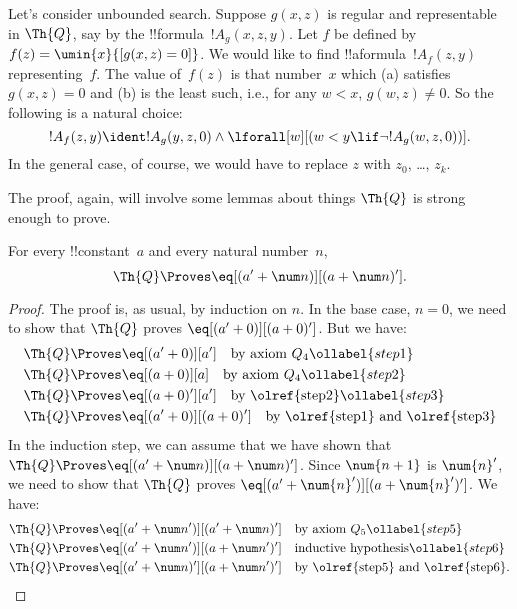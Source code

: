 \documentclass[../../../include/open-logic-section]{subfiles}
\begin{document}

Let's consider unbounded search. Suppose $g(x, z)$ is regular and
representable in $\Th{Q}$, say by the !!{formula}~$!A_g(x, z, y)$. Let
$f$ be defined by $f(z) = \umin{x}{[g(x, z) = 0]}$. We would like to find
!!a{formula}~$!A_f(z, y)$ representing~$f$.  The value of~$f(z)$ is
that number~$x$ which (a) satisfies $g(x, z) = 0$ and (b) is the least
such, i.e., for any $w < x$, $g(w, z) \neq 0$.  So the following is a
natural choice:
\[
!A_f(z,y) \ident !A_g(y, z, 0) \land \lforall[w][(w < y \lif \lnot
  !A_g(w, z, 0))].
\]
In the general case, of course, we would have to replace $z$ with
$z_0$, \dots, $z_k$.

The proof, again, will involve some lemmas about things $\Th{Q}$ is
strong enough to prove.

\begin{lem}
 For every !!{constant}~$a$ and every natural
number~$n$,
\[
\Th{Q} \Proves \eq[(a' + \num n)][(a + \num n)'].
\]
\end{lem}

\begin{proof}
The proof is, as usual, by induction on $n$. In the base case, $n =
0$, we need to show that $\Th{Q}$ proves $\eq[(a'+0)][(a+0)']$. But we have:
\begin{align}
  \Th{Q} & \Proves \eq[(a' + 0)][a'] \quad \text{by axiom $Q_4$}
  \ollabel{step1}\\
  \Th{Q} & \Proves  \eq[(a + 0)][a] \quad \text{by axiom $Q_4$}
  \ollabel{step2} \\
  \Th{Q} & \Proves \eq[(a + 0)'][a'] \quad \text{by \olref{step2}}
  \ollabel{step3} \\
  \Th{Q} & \Proves \eq[(a' + 0)][(a + 0)'] \quad
  \text{by \olref{step1} and \olref{step3}}\notag
\end{align}
In the induction step, we can assume that we have shown that $\Th{Q}
\Proves \eq[(a' + \num n)][(a + \num n)']$. Since
$\num{n+1}$ is $\num{n}'$, we need to show that $\Th{Q}$ proves
$\eq[(a' + \num{n}')][(a + \num{n}')']$. We have:
\begin{align}
  \Th{Q} & \Proves \eq[(a' + \num n')][(a' + \num n)'] \quad
  \text{by axiom $Q_5$} \ollabel{step5}\\
  \Th{Q} & \Proves \eq[(a' + \num n')][(a + \num n')'] \quad
  \text{inductive hypothesis} \ollabel{step6}\\
  \Th{Q} & \Proves \eq[(a' + \num n)'][(a + \num n')'] \quad
  \text{by \olref{step5} and \olref{step6}.} \notag
\end{align}
\end{proof}
\end{document}
